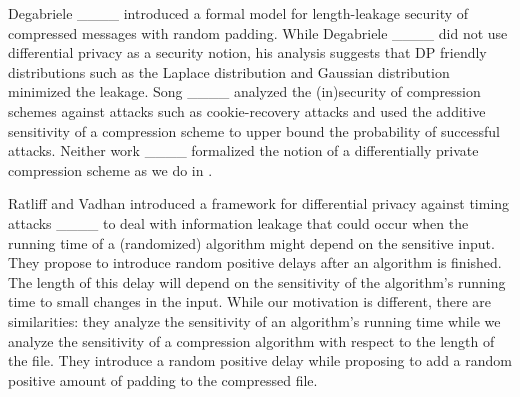 Degabriele ____ introduced a formal model for length-leakage security of compressed messages with random padding. While Degabriele ____ did not use differential privacy as a security notion, his analysis suggests that DP friendly distributions such as the  Laplace distribution and Gaussian distribution minimized the leakage. Song ____ analyzed the (in)security of compression schemes against attacks such as cookie-recovery attacks and used the additive sensitivity of a compression scheme to upper bound the probability of successful attacks. Neither work ____ formalized the notion of a differentially private compression scheme as we do in .  


Ratliff and Vadhan introduced a framework for differential privacy against timing attacks ____ to deal with information leakage that could occur when the running time of a (randomized) algorithm might depend on the sensitive input. They propose to introduce random positive delays after an algorithm is finished. The length of this delay will depend on the sensitivity of the algorithm's running time to small changes in the input. While our motivation is different, there are similarities: they analyze the sensitivity of an algorithm's running time while we analyze the sensitivity of a compression algorithm with respect to the length of the file. They introduce a random positive delay while proposing to add a random positive amount of padding to the compressed file. 



